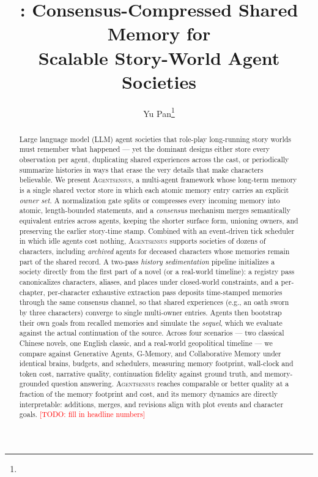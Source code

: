 \documentclass[11pt]{article}
\title{\sysname: Consensus-Compressed Shared Memory for\\ Scalable Story-World Agent Societies}
\author{Yu Pan\thanks{\todo{author list, affiliation, email}}}
\date{}
\newcommand{\sysname}{\textsc{Agentsensus}}
\newcommand{\todo}[1]{\textcolor{red}{[TODO: #1]}}
\begin{document}
\maketitle

\begin{abstract}
Large language model (LLM) agent societies that role-play long-running story worlds
must remember what happened --- yet the dominant designs either store every
observation per agent, duplicating shared experiences across the cast, or
periodically summarize histories in ways that erase the very details that make
characters believable. We present \sysname, a multi-agent framework whose
long-term memory is a single shared vector store in which each atomic memory
entry carries an explicit \emph{owner set}. A normalization gate splits or
compresses every incoming memory into atomic, length-bounded statements, and a
\emph{consensus} mechanism merges semantically equivalent entries across agents,
keeping the shorter surface form, unioning owners, and preserving the earlier
story-time stamp. Combined with an event-driven tick scheduler in which idle
agents cost nothing, \sysname{} supports societies of dozens of characters,
including \emph{archived} agents for deceased characters whose memories remain
part of the shared record. A two-pass \emph{history sedimentation} pipeline
initializes a society directly from the first part of a novel (or a real-world
timeline): a registry pass canonicalizes characters, aliases, and places under
closed-world constraints, and a per-chapter, per-character exhaustive extraction
pass deposits time-stamped memories through the same consensus channel, so that
shared experiences (e.g., an oath sworn by three characters) converge to single
multi-owner entries. Agents then bootstrap their own goals from recalled
memories and simulate the \emph{sequel}, which we evaluate against the actual
continuation of the source. Across four scenarios --- two classical Chinese
novels, one English classic, and a real-world geopolitical timeline --- we
compare against Generative Agents, G-Memory, and Collaborative Memory under
identical brains, budgets, and schedulers, measuring memory footprint,
wall-clock and
token cost, narrative quality, continuation fidelity against ground truth, and
memory-grounded question answering. \sysname{} reaches comparable or better
quality at a fraction of the memory footprint and cost, and its memory dynamics
are directly interpretable: additions, merges, and revisions align with plot
events and character goals. \todo{fill in headline numbers}
\end{abstract}
\end{document}
